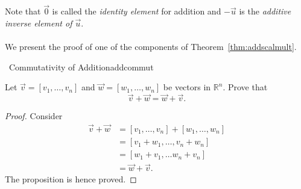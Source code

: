     \vphantom
    \\
    \\
    Note that \(\vec{0}\) is called the \textit{identity element} for addition and \(-\vec{u}\) is the \textit{additive inverse element of \(\vec{u}\)}.
    \pagebreak
    \\
    \\
    We present the proof of one of the components of Theorem~\ref{thm:addscalmult}.
    \begin{example}{\Difficulty\,\Difficulty\,\,Commutativity of Addition}{addcommut}

        Let \(\vec{v}=[v_1,\ldots,v_n]\) and \(\vec{w}=[w_1,\ldots,w_n]\) be vectors in \(\mathbb{R}^n\). Prove that
        \begin{equation*}
            \vec{v}+\vec{w}=\vec{w}+\vec{v}.
        \end{equation*}
        \begin{proof}
            Consider
            \begin{align*}
                \vec{v}+\vec{w}&=[v_1,\ldots,v_n]+[w_1,\ldots,w_n] \\
                &=[v_1+w_1,\ldots,v_n+w_n] \\
                &=[w_1+v_1,\ldots w_n+v_n] \\
                &=\vec{w}+\vec{v}.
            \end{align*}
            The proposition is hence proved.
        \end{proof}

    
    \end{example}
